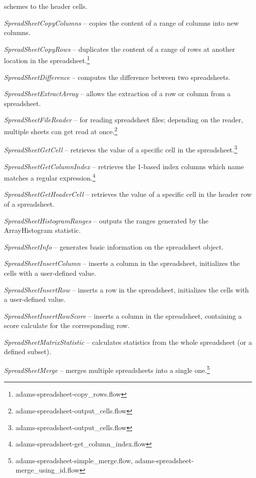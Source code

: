 \documentclass[a4paper]{book}
\begin{document}
\begin{tight_itemize}
	schemes to the header cells.
	\item \textit{SpreadSheetCopyColumns} -- copies the content of a range of
	columns into new columns.
	\item \textit{SpreadSheetCopyRows} -- duplicates the content of a range of
	rows at another location in the spreadsheet.\footnote{adams-spreadsheet-copy\_rows.flow}
	\item \textit{SpreadSheetDifference} -- computes the difference between two
	spreadsheets.
	\item \textit{SpreadSheetExtractArray} -- allows the extraction of a
	row or column from a spreadsheet.
	\item \textit{SpreadSheetFileReader} -- for reading spreadsheet
	files; depending on the reader, multiple sheets can get read at 
	once.\footnote{adams-spreadsheet-output\_cells.flow}
	\item \textit{SpreadSheetGetCell} -- retrieves the value of a specific cell
	in the spreadsheet.\footnote{adams-spreadsheet-output\_cells.flow}
	\item \textit{SpreadSheetGetColumnIndex} -- retrieves the 1-based index columns
	which name matches a regular expression.\footnote{adams-spreadsheet-get\_column\_index.flow}
	\item \textit{SpreadSheetGetHeaderCell} -- retrieves the value of a specific cell
	in the header row of a spreadsheet.
	\item \textit{SpreadSheetHistogramRanges} -- outputs the ranges generated by the
	ArrayHistogram statistic.
	\item \textit{SpreadSheetInfo} -- generates basic information on the
	spreadsheet object.
	\item \textit{SpreadSheetInsertColumn} -- inserts a column in the spreadsheet,
	initializes the cells with a user-defined value.
	\item \textit{SpreadSheetInsertRow} -- inserts a row in the spreadsheet,
	initializes the cells with a user-defined value.
	\item \textit{SpreadSheetInsertRowScore} -- inserts a column in the spreadsheet,
	containing a score calculate for the corresponding row.
	\item \textit{SpreadSheetMatrixStatistic} -- calculates statistics from
	the whole spreadsheet (or a defined subset).
	\item \textit{SpreadSheetMerge} -- merges multiple spreadsheets into a single
	one.\footnote{adams-spreadsheet-simple\_merge.flow, adams-spreadsheet-merge\_using\_id.flow}

\end{tight_itemize}
\end{document}
